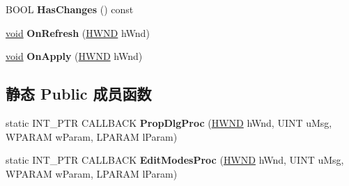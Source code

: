 \begin{DoxyCompactItemize}
\item 
\mbox{\label{class_c_layer_u_i_prop_page_a47d2ca360188288a789ce993648046f3}} 
B\+O\+OL {\bfseries Has\+Changes} () const
\item 
\mbox{\label{class_c_layer_u_i_prop_page_a29d654b0e92f97bdd5d3ceaf45aab1ba}} 
\hyperlink{interfacevoid}{void} {\bfseries On\+Refresh} (\hyperlink{interfacevoid}{H\+W\+ND} h\+Wnd)
\item 
\mbox{\label{class_c_layer_u_i_prop_page_a053855eff82f72d30894ccdac872dcfe}} 
\hyperlink{interfacevoid}{void} {\bfseries On\+Apply} (\hyperlink{interfacevoid}{H\+W\+ND} h\+Wnd)
\end{DoxyCompactItemize}
\subsection*{静态 Public 成员函数}
\begin{DoxyCompactItemize}
\item 
\mbox{\label{class_c_layer_u_i_prop_page_ade5a853ba072ec093f548c72e04d9472}} 
static I\+N\+T\+\_\+\+P\+TR C\+A\+L\+L\+B\+A\+CK {\bfseries Prop\+Dlg\+Proc} (\hyperlink{interfacevoid}{H\+W\+ND} h\+Wnd, U\+I\+NT u\+Msg, W\+P\+A\+R\+AM w\+Param, L\+P\+A\+R\+AM l\+Param)
\item 
\mbox{\label{class_c_layer_u_i_prop_page_a320863dfa254953f731df0aa077b47d4}} 
static I\+N\+T\+\_\+\+P\+TR C\+A\+L\+L\+B\+A\+CK {\bfseries Edit\+Modes\+Proc} (\hyperlink{interfacevoid}{H\+W\+ND} h\+Wnd, U\+I\+NT u\+Msg, W\+P\+A\+R\+AM w\+Param, L\+P\+A\+R\+AM l\+Param)
\end{DoxyCompactItemize}
